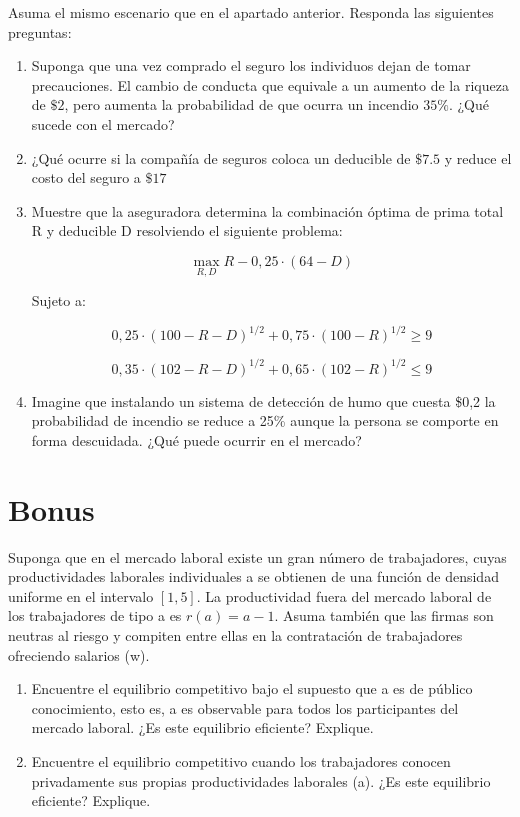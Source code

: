 \documentclass{exam}
\begin{document}
Asuma el mismo escenario que en el apartado anterior. Responda las siguientes preguntas:
\begin{enumerate}
    \item Suponga que una vez comprado el seguro los individuos dejan de tomar precauciones. El cambio de conducta que equivale a un aumento de la riqueza de $\$2$, pero aumenta la probabilidad de que ocurra un incendio $35 \%$. ¿Qué sucede con el mercado?

\item ¿Qué ocurre si la compañía de seguros coloca un deducible de $\$7.5$ y reduce el costo del seguro a $\$17$

\item Muestre que la aseguradora determina la combinación óptima de prima total R y deducible D resolviendo el siguiente problema:

$$ \max_{R,D} R - 0,25 \cdot (64 - D)$$

Sujeto a:

$$0,25 \cdot (100 - R - D)^{1/2} + 0,75 \cdot (100 - R)^{1/2} \geq 9$$

$$0,35 \cdot (102 - R - D)^{1/2} + 0,65 \cdot (102 - R)^{1/2} \leq 9$$

\item Imagine que instalando un sistema de detección de humo que cuesta \$0,2 la probabilidad de incendio se
reduce a 25\% aunque la persona se comporte en forma descuidada. ¿Qué puede ocurrir en el mercado?
\end{enumerate}



\section{Bonus}

Suponga que en el mercado laboral existe un gran número de trabajadores, cuyas productividades laborales individuales a se obtienen de una función de densidad uniforme en el intervalo $[1, 5]$. La productividad fuera del mercado laboral de los trabajadores de tipo a es $r(a) = a - 1$. Asuma también que las firmas son neutras al riesgo y compiten entre ellas en la contratación de trabajadores ofreciendo salarios (w).

\begin{enumerate}
    
\item  Encuentre el equilibrio competitivo bajo el supuesto que a es de público conocimiento, esto es, a es observable para todos los participantes del mercado laboral. ¿Es este equilibrio eficiente? Explique.

\item Encuentre el equilibrio competitivo cuando los trabajadores conocen privadamente sus propias productividades laborales (a). ¿Es este equilibrio eficiente? Explique.

\end{enumerate}
  
\end{document}
